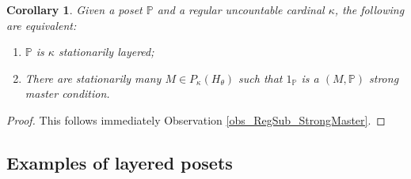 \documentclass{amsart}
\newtheorem{corollary}[theorem]{Corollary}
\begin{document}
\begin{corollary}\label{cor_TFAE_StatLayer_1StrongMaster}
Given a poset $\mathbb{P}$ and a regular uncountable cardinal $\kappa$, the following are equivalent:
\begin{enumerate}
 \item $\mathbb{P}$ is $\kappa$ stationarily layered;
 \item There are stationarily many $M  \in P_\kappa(H_\theta)$ such that $1_{\mathbb{P}}$ is a $(M, \mathbb{P})$ \emph{strong} master condition.
\end{enumerate}
\end{corollary}
\begin{proof}
This follows immediately Observation \ref{obs_RegSub_StrongMaster}.
\end{proof}



\subsection{Examples of layered posets}\label{sec_Examples}
\end{document}
